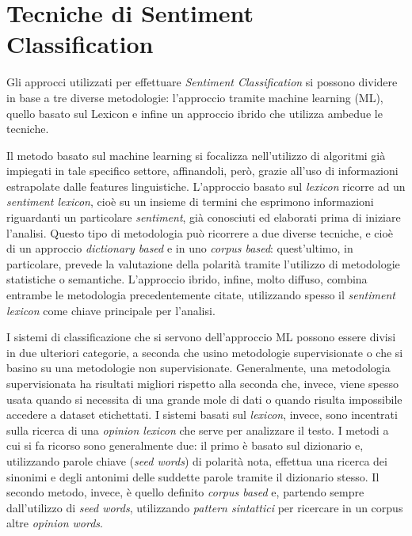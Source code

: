\documentclass[a4paper,12pt,openright,twoside]{report}
\theoremstyle{definition}
\begin{document}
\section{Tecniche di Sentiment Classification}
Gli approcci utilizzati per effettuare \emph{Sentiment Classification}
si possono dividere in base a tre diverse metodologie: l'approccio tramite
machine learning (ML), quello basato sul Lexicon e infine un approccio ibrido
che utilizza ambedue le tecniche.

Il metodo basato sul machine learning si focalizza nell'utilizzo di algoritmi
già impiegati in tale specifico settore, affinandoli, però, grazie all'uso 
di informazioni estrapolate dalle features linguistiche.
L'approccio basato sul \emph{lexicon} ricorre ad un \emph{sentiment lexicon},
cioè su un insieme di termini che esprimono informazioni riguardanti un particolare
\emph{sentiment}, già conosciuti ed elaborati prima di iniziare l'analisi.
Questo tipo di metodologia può ricorrere a due diverse tecniche,
e cioè di 
un approccio \emph{dictionary based} e in uno \emph{corpus based}:
quest'ultimo, in particolare, prevede la valutazione della polarità
tramite l'utilizzo di metodologie statistiche o
semantiche.
L'approccio ibrido, infine, molto diffuso, combina entrambe le metodologia precedentemente
citate, utilizzando spesso il \emph{sentiment lexicon} come chiave principale per l'analisi.

I sistemi di classificazione che  si servono dell'approccio ML possono essere 
divisi in due ulteriori categorie, a seconda che usino metodologie supervisionate
o che si basino su una metodologie non supervisionate. Generalmente, una metodologia
supervisionata ha risultati migliori rispetto alla seconda che, invece,
viene spesso usata quando si necessita di una grande mole di dati o quando risulta
impossibile accedere a dataset etichettati.
I sistemi basati sul \emph{lexicon}, invece, sono incentrati sulla ricerca di una \emph{opinion lexicon}
che serve per analizzare il testo. I metodi a cui si fa ricorso sono generalmente due:
il primo è basato sul dizionario e, utilizzando parole chiave (\emph{seed words}) di polarità nota,
effettua una ricerca dei sinonimi e degli antonimi delle suddette parole tramite il dizionario stesso.
Il secondo metodo, invece, è quello definito \emph{corpus based} e, partendo sempre dall'utilizzo di
\emph{seed words}, utilizzando \emph{pattern sintattici} per 
ricercare in un corpus altre \emph{opinion words}.
\end{document}
